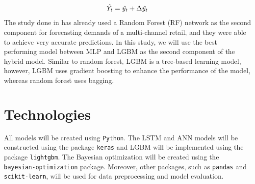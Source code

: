 \vspace{-5mm}
\[\hat{Y_t} = \hat{y_t} + \Delta \hat{y_t} \vspace{-5mm}\]
The study done in \cite{c8} has already used a Random Forest (RF) network as the second component for forecasting demands of a multi-channel retail, and they were able to achieve very accurate predictions.
In this study, we will use the best performing model between MLP and LGBM as the second component of the hybrid model. 
Similar to random forest, LGBM is a tree-based learning model, however, LGBM uses gradient boosting to enhance the performance of the model, whereas random forest uses bagging.

\section{Technologies}
All models will be created using \texttt{Python}. 
The LSTM and ANN models will be constructed using the package \texttt{keras} and LGBM will be implemented using the package \texttt{lightgbm}. 
The Bayesian optimization will be created using the \texttt{bayesian-optimization} package.
Moreover, other packages, such as \texttt{pandas} and \texttt{scikit-learn}, will be used for data preprocessing and model evaluation.